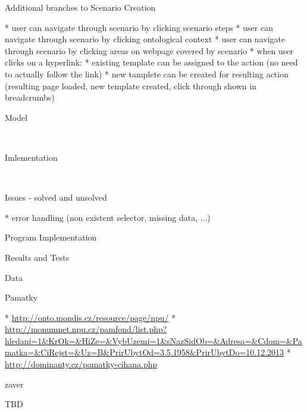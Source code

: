 \secc Additional branches to Scenario Creation

\begitems
  * user can navigate through scenario by clicking scenario steps
  * user can navigate through scenario by clicking ontological context
  * user can navigate through scenario by clicking areas on webpage covered by scenario
  * when user clicks on a hyperlink: 
  \begitems
    * existing template can be assigned to the action (no need to actually follow the link)
    * new tamplete can be created for resulting action (resulting page loaded, new template created, click through shown in breadcrumbs)
  \enditems
\enditems



\sec Model

~


\sec Imlementation

~


\sec Issues - solved and unsolved

\begitems
  * error handling (non existent selector, missing data, ...)
\enditems





\chap Program Implementation
~







\chap Results and Tests 


\sec Data
~

\secc Pamatky

\begitems
  * \url{http://onto.mondis.cz/resource/page/npu/}
  * \url{http://monumnet.npu.cz/pamfond/list.php?hledani=1&KrOk=&HiZe=&VybUzemi=1&sNazSidOb=&Adresa=&Cdom=&Pamatka=&CiRejst=&Uz=B&PrirUbytOd=3.5.1958&PrirUbytDo=10.12.2013}
  * \url{http://dominanty.cz/pamatky-cihana.php}
\enditems





\chap zaver

TBD


\bye
